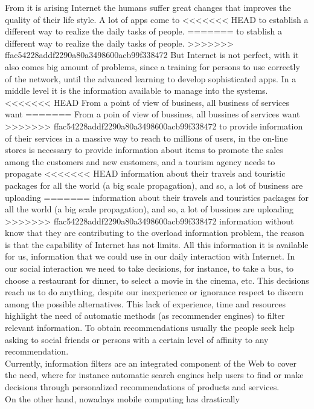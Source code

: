 From it is arising Internet the humans suffer great changes
that improves the quality of their life style. A lot of apps come to 
<<<<<<< HEAD
to establish a different way to realize the daily tasks of people.
=======
to stablish a different way to realize the daily tasks of people.
>>>>>>> ffac54228addf2290a80a3498600acb99f338472
But Internet is not perfect, with it also comes big amount of problems, 
since a training for persons to use correctly of the network, until the
advanced learning to develop sophisticated apps. In a middle level
it is the information available to manage into the systems. 
<<<<<<< HEAD
From a point of view of business, all business of services want 
=======
From a poin of view of bussines, all bussines of services want 
>>>>>>> ffac54228addf2290a80a3498600acb99f338472
to provide information of their services in a massive way to reach
to millions of users, 
in the on-line stores is necessary to provide information about 
items to promote the sales among the customers 
and new customers, and a tourism agency needs to propagate
<<<<<<< HEAD
information about their travels and touristic packages for all
the world (a big scale propagation), and so, a lot of 
business are uploading 
=======
information about their travels and touristics packages for all
the world (a big scale propagation), and so, a lot of 
bussines are uploading 
>>>>>>> ffac54228addf2290a80a3498600acb99f338472
information without know that they are contributing to 
the overload information problem, 
the reason is that the capability of Internet has not limits.
All this information it is available for us, information that 
we could use in our daily interaction with Internet.
In our social interaction we need to take decisions, 
for instance, to take a bus, to choose a restaurant for dinner,
to select a movie in the cinema, etc. This decisions reach us to 
do anything,  despite our inexperience or ignorance respect to
discern among the possible alternatives.
This lack of experience, time and resources 
highlight the need of automatic methods (as recommender engines) 
to filter relevant information.
To obtain recommendations usually the people seek help 
asking to social friends or persons with a certain 
level of affinity to any recommendation.\\
Currently, information filters are
an integrated component of the Web to cover the need, 
where for instance
automatic search engines help users to find or make 
decisions through personalized recommendations
of products and services. \\ 
On the other hand, nowadays mobile computing has drastically 
